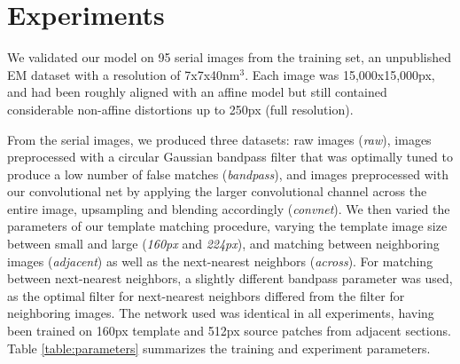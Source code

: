 \documentclass{article}
\begin{document}
 


\section{Experiments}

We validated our model on 95 serial images from the training set, an unpublished EM dataset with a resolution of 7x7x40nm$^3$. Each image was 15,000x15,000px, and had been roughly aligned with an affine model but still contained considerable non-affine distortions up to 250px (full resolution).

From the serial images, we produced three datasets: raw images (\textit{raw}), images preprocessed with a circular Gaussian bandpass filter that was optimally tuned to produce a low number of false matches (\textit{bandpass}), and images preprocessed with our convolutional net by applying the larger convolutional channel across the entire image, upsampling and blending accordingly (\textit{convnet}). We then varied the parameters of our template matching procedure, varying the template image size between small and large (\textit{160px} and \textit{224px}), and matching between neighboring images (\textit{adjacent}) as well as the next-nearest neighbors (\textit{across}). For matching between next-nearest neighbors, a slightly different bandpass parameter was used, as the optimal filter for next-nearest neighbors differed from the filter for neighboring images. The network used was identical in all experiments, having been trained on 160px template and 512px source patches from adjacent sections. Table \ref{table:parameters} summarizes the training and experiment parameters.
\end{document}
